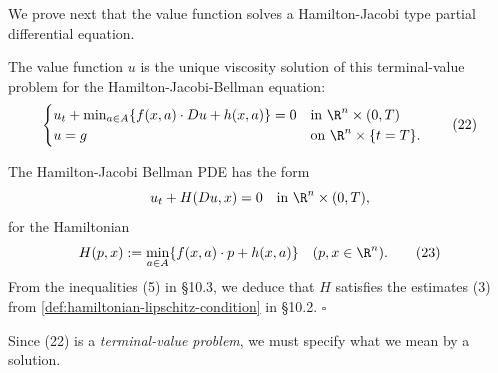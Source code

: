 We prove next that the value function solves a Hamilton-Jacobi type partial differential equation.

\begin{theorem}
\label{thm:value-function-solves-hjb-equation}
The value function $u$ is the unique viscosity solution of this terminal-value problem for the Hamilton-Jacobi-Bellman equation:
\[
\begin{cases}
u_t + \min_{a \in A}\{f(x,a) \cdot Du + h(x,a)\} = 0 & \text{in } \R^n \times (0,T) \\
u = g & \text{on } \R^n \times \{t = T\}.
\end{cases}
\tag{22}
\]
\end{theorem}

\begin{remark}
\label{rem:hjb-hamiltonian-formula}
The Hamilton-Jacobi Bellman PDE has the form
\[
u_t + H(Du, x) = 0 \quad \text{in } \R^n \times (0,T),
\]
for the Hamiltonian
\[
H(p,x) := \min_{a \in A}\{f(x,a) \cdot p + h(x,a)\} \quad (p, x \in \R^n).
\tag{23}
\]
From the inequalities (5) in \S10.3, we deduce that $H$ satisfies the estimates (3) from \cref{def:hamiltonian-lipschitz-condition} in \S10.2. $\square$
\end{remark}

Since (22) is a \textit{terminal-value problem}, we must specify what we mean by a solution.

